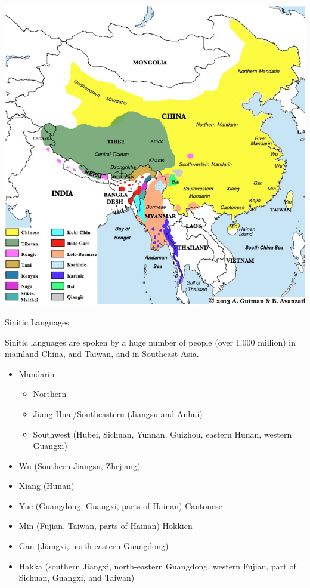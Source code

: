 \documentclass{beamer}
\begin{document}
\begin{frame}
  \begin{center}
  \includegraphics[height=0.9\textheight]{pics/tibeto-burman-map}
\end{center}
\end{frame}

\begin{frame}{Sinitic Languages}

Sinitic languages are spoken by a huge number of people (over 1,000 million)
in mainland China, and Taiwan, and in Southeast Asia.
\begin{itemize}
\item Mandarin
  \begin{itemize}
  \item Northern
  \item Jiang-Huai/Southeastern (Jiangsu and Anhui)
  \item Southwest (Hubei, Sichuan, Yunnan, Guizhou, eastern Hunan, western Guangxi)
  \end{itemize}
\item Wu (Southern Jiangsu, Zhejiang)
\item Xiang (Hunan)
\item Yue (Guangdong, Guangxi, parts of Hainan)  Cantonese
\item Min (Fujian, Taiwan, parts of Hainan)  Hokkien
\item Gan (Jiangxi, north-eastern Guangdong)
\item Hakka (southern Jiangxi, north-eastern Guangdong, western Fujian, part
of Sichuan, Guangxi, and Taiwan)
\end{itemize}

\end{frame}
\end{document}
